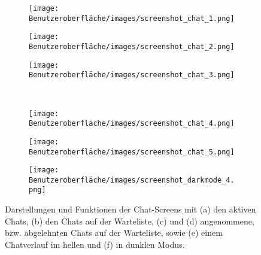 \begin{figure}[H]
	\begin{subfigure}{0.33\textwidth}
	\centering
	\texttt{[image: Benutzeroberfläche/images/screenshot\_chat\_1.png]}
	\caption{}
	\label{fig:chat_a}
	\end{subfigure}
	\begin{subfigure}{0.33\textwidth}
	\centering
	\texttt{[image: Benutzeroberfläche/images/screenshot\_chat\_2.png]}
	\caption{}
	\label{fig:chat_b}
	\end{subfigure}
	\begin{subfigure}{0.33\textwidth}
	\centering
	\texttt{[image: Benutzeroberfläche/images/screenshot\_chat\_3.png]}
	\caption{}
	\label{fig:chat_c}
	\end{subfigure}\\ \vspace{1cm}	
	
	\begin{subfigure}{0.33\textwidth}
	\centering
	\texttt{[image: Benutzeroberfläche/images/screenshot\_chat\_4.png]}
	\caption{}
	\label{fig:chat_d}
	\end{subfigure}
	\begin{subfigure}{0.33\textwidth}
	\centering
	\texttt{[image: Benutzeroberfläche/images/screenshot\_chat\_5.png]}
	\caption{}
	\label{fig:chat_e}
	\end{subfigure}
	\begin{subfigure}{0.33\textwidth}
	\centering
	\texttt{[image: Benutzeroberfläche/images/screenshot\_darkmode\_4.png]}
	\caption{}
	\label{fig:chat_f}
	\end{subfigure}
\caption[Screenshots der Chat-Seiten]{Darstellungen und Funktionen der Chat-Screens mit (a) den aktiven Chats, (b) den Chats auf der Warteliste, (c) und (d) angenommene, bzw. abgelehnten Chats auf der Warteliste, sowie (e) einem Chatverlauf im hellen und (f) in dunklen Modus.}
\label{fig:chat_alle}
\end{figure}
